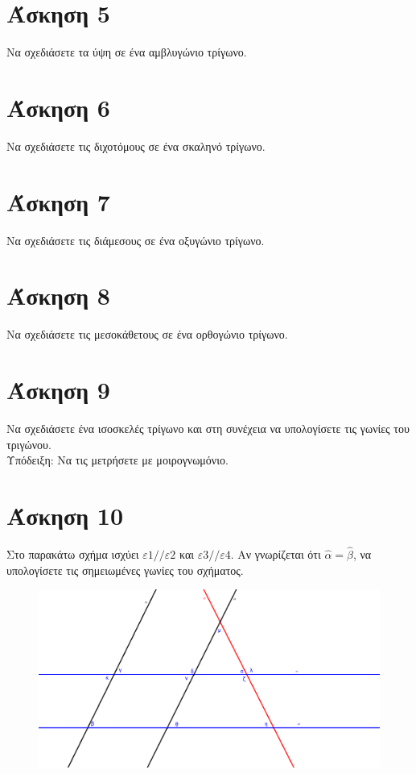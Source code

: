 \documentclass[a4paper,10pt]{report}
\begin{document}
\section*{Άσκηση 5  \hfill \small{}}
Να σχεδιάσετε τα ύψη σε ένα  αμβλυγώνιο τρίγωνο.



\section*{Άσκηση 6  \hfill \small{}}
Να σχεδιάσετε τις διχοτόμους σε ένα σκαληνό τρίγωνο.

\section*{Άσκηση 7  \hfill \small{}}
Να σχεδιάσετε τις διάμεσους σε ένα οξυγώνιο τρίγωνο. 



\section*{Άσκηση 8  \hfill \small{}}
Να σχεδιάσετε τις μεσοκάθετους σε ένα ορθογώνιο τρίγωνο.

\section*{Άσκηση 9  \hfill \small{}}
Να σχεδιάσετε ένα ισοσκελές τρίγωνο και στη συνέχεια να υπολογίσετε τις γωνίες του τριγώνου.\\
Υπόδειξη: Να τις μετρήσετε με μοιρογνωμόνιο.


\section*{Άσκηση 10  \hfill \small{}}
Στο παρακάτω σχήμα ισχύει $ε1//ε2$ και $ε3//ε4$. Αν γνωρίζεται ότι $\hat{α}=\hat{β}$, να υπολογίσετε τις 
σημειωμένες γωνίες του σχήματος.
\begin{figure}[ht]
\centering
\label{apotelesmata_sel14}
\includegraphics[scale=.3]{5lines.png}
\end{figure}



\end{document}
